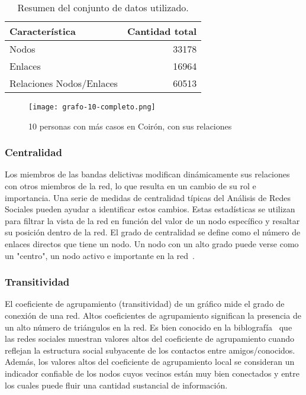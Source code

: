 \begin{table}
	\caption{Resumen del conjunto de datos utilizado.}\label{tab:EstadisticasResumidas}
	\centering
	\begin{tabular}{|l|r|}
		\hline
		\textbf{Característica} &  \textbf{Cantidad total} \\
		\hline
		Nodos &  33178 \\
		\hline
		Enlaces &  16964 \\
		\hline
		Relaciones Nodos/Enlaces &  60513 \\
		\hline
	\end{tabular}
\end{table}

\begin{figure}
	\texttt{[image: grafo-10-completo.png]}
	\caption{10 personas con más casos en Coirón, con sus relaciones} 
	\label{fig:grafoTop10}
\end{figure}

\subsubsection{Centralidad} Los miembros de las bandas delictivas modifican dinámicamente sus relaciones con otros miembros de la red, lo que resulta en un cambio de su rol e importancia. Una serie de medidas de centralidad típicas del Análisis de Redes Sociales pueden ayudar a identificar estos cambios. Estas estadísticas se utilizan para filtrar la vista de la red en función del valor de un nodo específico y resaltar su posición dentro de la red. El grado de centralidad se define como el número de enlaces directos que tiene un nodo. Un nodo con un alto grado puede verse como un "centro", un nodo activo e importante en la red~\cite{ref_article32}.

\subsubsection{Transitividad} El coeficiente de agrupamiento (transitividad) de un gráfico mide el grado de conexión de una red. Altos coeficientes de agrupamiento significan la presencia de un alto número de triángulos en la red. Es bien conocido en la biblografía~\cite{ref_article34} que las redes sociales muestran valores altos del coeficiente de agrupamiento cuando reflejan la estructura social subyacente de los contactos entre amigos/conocidos. Además, los valores altos del coeficiente de agrupamiento local se consideran un indicador confiable de los nodos cuyos vecinos están muy bien conectados y entre los cuales puede fluir una cantidad sustancial de información.

